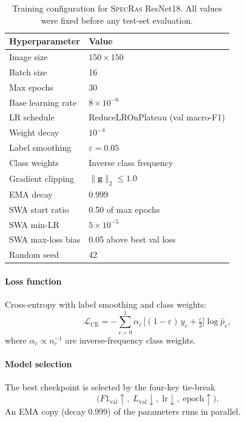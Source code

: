 \documentclass[preprint,12pt,3p]{elsarticle}
\newcommand{\zerone}{\textsc{SpecRas}\xspace}      %
\begin{document}
\begin{table}[H]
  \centering
  \small
  \caption{%
    Training configuration for \zerone ResNet18.
    All values were fixed before any test-set evaluation.
  }
  \label{tab:hyper_zerone}
  \renewcommand{\arraystretch}{1.2}
  \begin{tabular}{@{}lp{3.8cm}@{}}
    \toprule
    Hyperparameter & Value \\
    \midrule
    Image size               & $150 \times 150$ \\
    Batch size               & 16 \\
    Max epochs               & 30 \\
    Base learning rate       & $8\times10^{-6}$ \\
    LR schedule              & ReduceLROnPlateau (val macro-F1) \\
    Weight decay             & $10^{-4}$ \\
    Label smoothing          & $\varepsilon = 0.05$ \\
    Class weights            & Inverse class frequency \\
    Gradient clipping        & $\|\mathbf{g}\|_2 \leq 1.0$ \\
    EMA decay                & $0.999$ \\
    SWA start ratio          & 0.50 of max epochs \\
    SWA min-LR               & $5 \times 10^{-5}$ \\
    SWA max-loss bias        & 0.05 above best val loss \\
    Random seed              & 42 \\
    \bottomrule
  \end{tabular}
\end{table}

\paragraph{Loss function}
Cross-entropy with label smoothing and class weights:
%
\begin{equation}
  \mathcal{L}_\mathrm{CE} =
  -\sum_{c=0}^{1} \alpha_c \,
  \bigl[(1-\varepsilon)\,y_c + \tfrac{\varepsilon}{2}\bigr]
  \log \hat{p}_c,
  \label{eq:ce_loss}
\end{equation}
%
where $\alpha_c \propto n_c^{-1}$ are inverse-frequency class weights.

\paragraph{Model selection}
The best checkpoint is selected by the four-key tie-break
\[
  \bigl(F1_\mathrm{val}\!\uparrow,\; L_\mathrm{val}\!\downarrow,\;
  \mathrm{lr}\!\downarrow,\; \mathrm{epoch}\!\uparrow\bigr).
\]
An EMA copy (decay 0.999) of the parameters runs in parallel.
\end{document}
